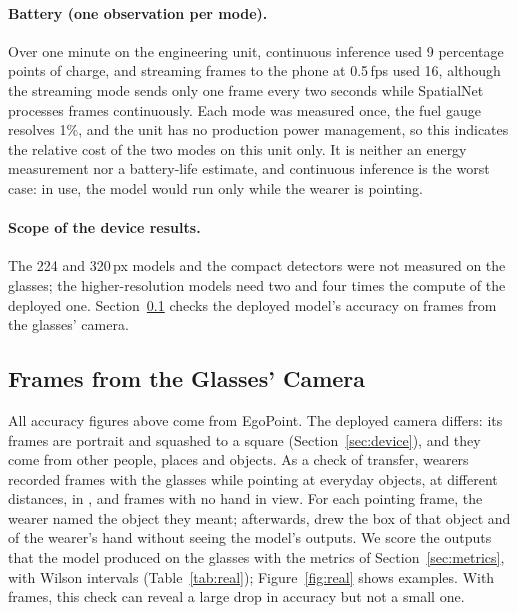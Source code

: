\paragraph{Battery (one observation per mode).} Over one minute on the engineering unit, continuous inference used 9 percentage points of charge, and streaming frames to the phone at 0.5\,fps used 16, although the streaming mode sends only one frame every two seconds while SpatialNet processes frames continuously. Each mode was measured once, the fuel gauge resolves 1\%, and the unit has no production power management, so this indicates the relative cost of the two modes on this unit only. It is neither an energy measurement nor a battery-life estimate, and continuous inference is the worst case: in use, the model would run only while the wearer is pointing.

\paragraph{Scope of the device results.} The 224 and 320\,px models and the compact detectors were not measured on the glasses; the higher-resolution models need two and four times the compute of the deployed one. Section~\ref{sec:realframes} checks the deployed model's accuracy on frames from the glasses' camera.

\subsection{Frames from the Glasses' Camera}\label{sec:realframes}

All accuracy figures above come from EgoPoint. The deployed camera differs: its frames are portrait and squashed to a square (Section~\ref{sec:device}), and they come from other people, places and objects. As a check of transfer,  wearers recorded  frames with the glasses while pointing at everyday objects, at different distances, in , and  frames with no hand in view. For each pointing frame, the wearer named the object they meant; afterwards,  drew the box of that object and of the wearer's hand without seeing the model's outputs. We score the outputs that the model produced on the glasses with the metrics of Section~\ref{sec:metrics}, with Wilson intervals (Table~\ref{tab:real}); Figure~\ref{fig:real} shows examples.  With  frames, this check can reveal a large drop in accuracy but not a small one.


